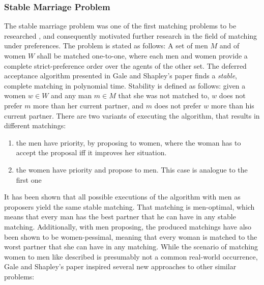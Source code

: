 \subsubsection{Stable Marriage Problem}\label{intro:stable-marriage}
The stable marriage problem was one of the first matching problems to be researched \cite{GaleShapleyOrig}, and consequently motivated further research in the field of matching under preferences.
\newline
The problem is stated as follows: A set of men $M$ and of women $W$ shall be matched one-to-one, where each men and women provide a complete strict-preference order over the agents of the other set. The deferred acceptance algorithm presented in Gale and Shapley's paper\cite{GaleShapleyOrig} finds a \textit{stable}, complete matching in polynomial time. Stability is defined as follows: given a women $w \in W$ and any man $m \in M$ that she was not matched to, $w$ does not prefer $m$ more than her current partner, and $m$ does not prefer $w$ more than his current partner. There are two variants of executing the algorithm, that results in different matchings: 
\begin{enumerate}
    \item the men have priority, by proposing to women, where the woman has to accept the proposal iff it improves her situation.  
    \item the women have priority and propose to men. This case is analogue to the first one
\end{enumerate}
It has been shown that all possible executions of the algorithm with men as proposers yield the same stable matching. That matching is men-optimal, which means that every man has the best partner that he can have in any stable matching.\cite{Gusfield} Additionally, with men proposing, the produced matchings have also been shown to be women-pessimal, meaning that every woman is matched to the worst partner that she can have in any matching.\cite{Gusfield}
While the scenario of matching women to men like described is presumably not a common real-world occurrence, Gale and Shapley's paper inspired several new approaches to other similar problems:


